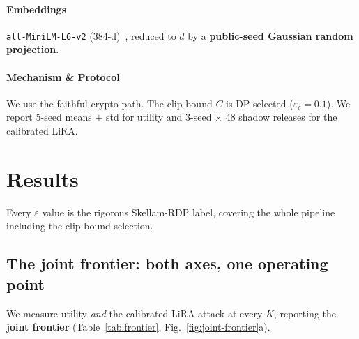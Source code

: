 \documentclass[conference]{IEEEtran}
\theoremstyle{remark}
\newcommand{\eps}{\varepsilon}
\begin{document}
\paragraph{Embeddings} \texttt{all-MiniLM-L6-v2} (384-d)~\cite{reimers2019sbert}, reduced to $d$ by a \textbf{public-seed Gaussian random projection}.

\paragraph{Mechanism \& Protocol} We use the faithful crypto path. The clip bound $C$ is DP-selected ($\eps_c = 0.1$). We report 5-seed means $\pm$ std for utility and 3-seed $\times$ 48 shadow releases for the calibrated LiRA.

\section{Results}\label{sec:results}

Every $\eps$ value is the rigorous Skellam-RDP label, covering the whole pipeline including the clip-bound selection. 

\subsection{The joint frontier: both axes, one operating point}\label{sec:frontier}

We measure utility \emph{and} the calibrated LiRA attack at every $K$, reporting the \textbf{joint frontier} (Table~\ref{tab:frontier}, Fig.~\ref{fig:joint-frontier}a).
\end{document}
